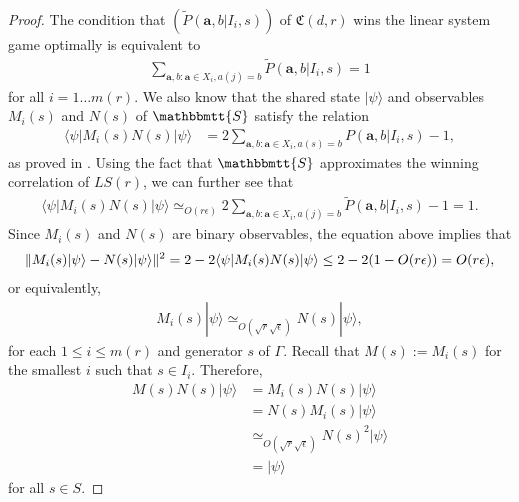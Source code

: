 \documentclass[11pt,letterpaper]{article}
\newcommand{\ket}[1]{|#1\rangle}
\newcommand{\bra}[1]{\langle#1|}
\DeclarePairedDelimiter{\norm}{\lVert}{\rVert}
\newcommand{\1}{\mathbb{1}}
\newcommand{\LS}{LS}
\newcommand{\mr}{m(r)}
\newcommand{\fC}{\mathfrak{C}}
\newcommand{\ba}{\pmb{a}}
\newcommand{\bS}{\mathbbmtt{S}}
\newcommand{\pr}[2]{P(#1|#2)}
\newcommand{\tpr}[2]{\tilde{P}(#1|#2)}
\newcommand{\ep}{\epsilon}
\newcommand{\se}{\sqrt{\epsilon}}
\newcommand{\sr}{\sqrt{r}}
\newcommand{\appd}[1]{\simeq_{#1}}
\theoremstyle{definition}
\begin{document}
\begin{proof}
The condition that $(\tpr{\ba, b}{I_i, s})$ of $\fC(d,r)$ wins the linear system game optimally is equivalent to
\begin{align*}
\sum_{\ba,b: \ba \in X_i, a(j) = b} \tpr{\ba, b}{I_i, s} = 1
\end{align*}
for all $i = 1 \dots \mr$.
We also know that the shared state $\ket{\psi}$ and observables $M_i(s)$
and $N(s)$ of $\bS$ satisfy the relation
\begin{align*}
	\bra{\psi} M_i(s) N(s) \ket{\psi} &= 2 \sum_{\ba,b: \ba \in X_i, a(s) = b} \pr{\ba, b}{I_i, s} -1,
\end{align*}
as proved in \cite{slofstra2017}.
Using the fact that $\bS$ approximates the winning correlation of $\LS(r)$, 
we can further see that
\begin{align*}
	\bra{\psi} M_i(s) N(s) \ket{\psi} \appd{O(r \ep)} 2\sum_{\ba,b: \ba \in X_i, a(j) = b} \tpr{\ba, b}{I_i, s} - 1 = 1.
\end{align*}
Since $M_i(s)$ and $N(s)$ are binary observables, the equation above
implies that
\begin{align*}
    \norm{M_i(s)\ket{\psi} - N(s)\ket{\psi}}^2 
    = 2 - 2 \bra{\psi}M_i(s)N(s) \ket{\psi} 
    \leq 2 - 2(1 - O(r\ep)) = O(r\ep),
\end{align*}
or equivalently,
\begin{align*}
	M_{i}(s) \ket{\psi} \appd{O(\sr\se)} N(s) \ket{\psi},
\end{align*}
for each $1 \leq i \leq \mr$ and generator $s$ of
$\Gamma$.
Recall that $M(s) := M_{i}(s)$ for the smallest $i$ such that $ s \in I_i$.
Therefore, 
\begin{align*}
	M(s) N(s) \ket{\psi} & = M_{i}(s)N(s)\ket{\psi} \\
	    & = N(s) M_{i}(s) \ket{\psi} \\
	    &\appd{O(\sr\se)} N(s)^2 \ket{\psi} \\
	    &= \ket{\psi}
\end{align*}
for all $s \in S$.  


\end{proof}
\end{document}
